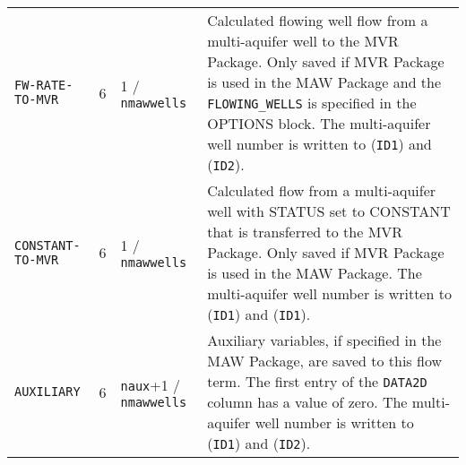 \begin{longtable}{p{3.5cm} p{2cm} p{3.5cm} p{6.5cm}}
\texttt{FW-RATE-TO-MVR} & 6 & 1 / \texttt{nmawwells} & Calculated flowing well flow from a multi-aquifer well to the MVR Package. Only saved if MVR Package is used in the MAW Package and the \texttt{FLOWING\_WELLS} is specified in the OPTIONS block. The multi-aquifer well number is written to (\texttt{ID1}) and (\texttt{ID2}). \\
\texttt{CONSTANT-TO-MVR} & 6 & 1 / \texttt{nmawwells} & Calculated flow from a multi-aquifer well with STATUS set to CONSTANT that is transferred to the MVR Package. Only saved if MVR Package is used in the MAW Package. The multi-aquifer well number is written to (\texttt{ID1}) and (\texttt{ID1}). \\
\texttt{AUXILIARY} & 6 & \texttt{naux}+1 / \texttt{nmawwells} & Auxiliary variables, if specified in the MAW Package, are saved to this flow term. The first entry of the \texttt{DATA2D} column has a value of zero. The multi-aquifer well number is written to (\texttt{ID1}) and (\texttt{ID2}).
\label{table:binarymaw}
\end{longtable}


